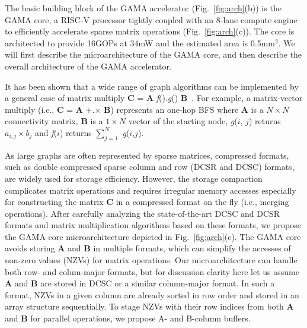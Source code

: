 \noindent
The basic building block of the GAMA accelerator (Fig.~\ref{fig:arch}(b)) is the GAMA core,
a RISC-V processor  tightly coupled with an 8-lane compute engine to efficiently accelerate sparse matrix operations (Fig.~\ref{fig:arch}(c)).
The core is architected to provide 16GOPs at 34mW and the estimated area is 0.5mm$^2$.
We will first describe the microarchitecture of the GAMA core, and then describe the overall architecture of the GAMA accelerator.


It has been shown that a wide range of graph algorithms can be implemented by a general case of matrix multiply \textbf{C} = \textbf{A} \textit{f}().\textit{g}() \textbf{B}~\cite{graph:primitives}. 
For example, a matrix-vector multiply (i.e., \textbf{C} = \textbf{A} +.$\times$ \textbf{B}) represents an one-hop BFS 
where \textbf{A} is a $N \times N$ connectivity matrix, \textbf{B} is a $1 \times N$ vector of the starting node, 
\textit{g}($i$, $j$) returns $a_{i,j} \times b_{j}$ and \textit{f}($i$) returns $\sum_{j=1}^{N}$ \textit{g}($i$,$j$).


As large graphs are often represented by sparse matrices, compressed formats, such as double compressed sparse column and row (DCSR and DCSC) formats, are widely used for storage efficiency.
However, the storage compaction complicates matrix operations and requires irregular memory accesses especially for constructing the matrix \textbf{C} in a compressed format on the fly (i.e., merging operations).
After carefully analyzing the state-of-the-art DCSC and DCSR formats and matrix multiplication algorithms based on these formats, 
we propose the GAMA core microarchitecture depicted in Fig.~\ref{fig:arch}(c). The GAMA core avoids storing \textbf{A} and \textbf{B} in multiple formats, which can simplify the accesses of  non-zero values (NZVs) for matrix operations.
Our microarchitecture can handle both row- and colum-major formats, but for discussion clarity here let us assume  \textbf{A} and \textbf{B} are stored in DCSC or a similar column-major format.
In such a format, NZVs in a given column are already sorted in row order and stored in an array structure sequentially. 
To stage NZVs with their row indices from both \textbf{A} and \textbf{B} for parallel operations, we propose A- and B-column buffers. 

